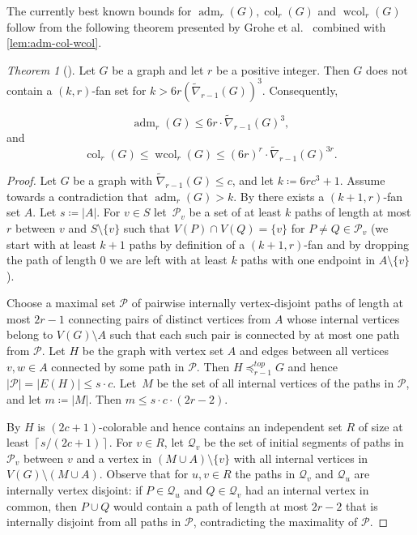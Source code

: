 \documentclass[1p,number,a4paper]{elsarticle}
\theoremstyle{remark}
\newcommand{\minor}{\preccurlyeq}
\DeclareMathOperator{\col}{col}
\DeclareMathOperator{\wcol}{wcol}
\DeclareMathOperator{\adm}{adm}
\newtheorem{theorem}{Theorem}[section]
\begin{document}
The currently
best known bounds for $\adm_r(G), \col_r(G)$ and $\wcol_r(G)$ follow from
the following theorem presented by Grohe et al.~\cite{grohe2015colouring}
combined with \cref{lem:adm-col-wcol}.

\begin{theorem}[\cite{grohe2015colouring}]\label{thm:adm-bound}
  Let $G$ be a graph and let $r$ be a positive integer. Then
  $G$ does not contain a $(k,r)$-fan set for $k>6r(\widetilde\nabla_{r-1}(G))^3$. Consequently, 

  \[\adm_r(G)\leq 6r \cdot \widetilde\nabla_{r-1}(G)^3,\]
  and
    \[\col_r(G)\leq \wcol_r(G)\leq (6r)^r\cdot \widetilde\nabla_{r-1}(G)^{3r}.\]
\end{theorem}

\begin{proof}
Let $G$ be a graph with $\widetilde\nabla_{r-1}(G)\le c$, and let
$k\coloneqq6rc^3+1$. Assume towards a contradiction that
$\adm_r(G)>k$. By  there exists a $(k+1,r)$-fan set $A$. Let $s\coloneqq|A|$.
For $v\in S$ let~$\mathcal{P}_v$ be a set of at least $k$ paths of length at most $r$ between $v$ and $S\setminus \{v\}$ such that 
$V(P)\cap V(Q)=\{v\}$ for $P\neq Q\in \mathcal{P}_v$ (we start with at least $k+1$ paths by definition of a $(k+1,r)$-fan and by dropping the path of length $0$ we are left with at least $k$ paths with one endpoint in $A\setminus \{v\}$).

Choose a maximal set $\mathcal{P}$ of pairwise internally
vertex-disjoint paths of length at most $2r-1$ connecting pairs of
distinct vertices from $A$ whose internal vertices belong to
$V(G)\setminus A$ such that each such pair is connected by at
most one path from $\mathcal{P}$. Let $H$ be the graph with vertex set $A$ and edges between all vertices $v,w\in A$ connected by some path in $\mathcal P$. Then $H\minor_{r-1}^{top}G$ and hence
$|\mathcal{P}|=|E(H)|\leq s\cdot c$.  Let~$M$ be the set of all
internal vertices of the paths in $\mathcal{P}$, and let
$m\coloneqq|M|$. Then $m\leq s\cdot c\cdot (2r-2)$.


By  $H$ is $(2c+1)$-colorable and hence contains an independent set $R$ of size at least $\left\lceil s/(2c+1)\right\rceil$.
For $v\in R$, let $\mathcal Q_v$ be the set of initial
segments of paths in $\mathcal{P}_v$ between $v$ and a vertex in
$(M\cup A)\setminus\{v\}$ with all internal vertices in
$V(G)\setminus(M\cup A)$. Observe that for $u,v\in R$ the paths in
$\mathcal Q_v$ and $\mathcal Q_u$ are internally vertex disjoint: 
if $P\in\mathcal Q_u$ and $Q\in\mathcal Q_v$ had an internal vertex
in common, then $P\cup Q$ would contain a path of length at most
$2r-2$ that is internally disjoint from all paths in $\mathcal P$,
contradicting the maximality of $\mathcal P$.


\end{proof}
\end{document}
